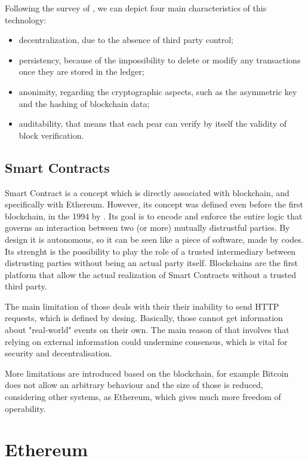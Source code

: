 Following the survey of \citet{BlockChain1}, we can depict four main characteristics of this technology:
\begin{itemize}
    \item decentralization, due to the absence of third party control;
    \item persistency, because of the impossibility to delete or modify any transactions once they are stored in the ledger;
    \item anonimity, regarding the cryptographic aspects, such as the asymmetric key 
    and the hashing of blockchain data;
    \item auditability, that means that each pear can verify by itself the validity of block verification.
\end{itemize}


\subsection{Smart Contracts}

Smart Contract is a concept which is directly associated with blockchain, and specifically with Ethereum.
However, its concept was defined even before the first blockchain, in the 1994 by \citet{SmartContractDef}.
Its goal is to encode and enforce the entire logic that governs an interaction
between two (or more) mutually distrustful parties. By design it is autonomous, so it can be seen like a piece of software, made by codes.
Its strenght is the possibility to play the role of a trusted intermediary between distrusting parties
without being an actual party itself.
Blockchains are the first platform that allow the actual realization of
Smart Contracts without a trusted third party. 

The main limitation of those deals with their their inability to send HTTP requests, which is defined by desing. 
Basically, those cannot get information about "real-world" events on their own. 
The main reason of that involves that relying on external information could undermine consensus, which is vital for security and decentralisation. 

More limitations are introduced based on the blockchain, for example Bitcoin does not allow an arbitrary behaviour and the size of those is reduced, 
considering other systems, as Ethereum, which gives much more freedom of operability.

\section{Ethereum}
\label{sec:Backgroud:Ethereum}


